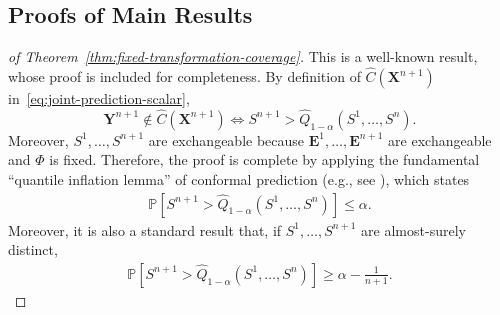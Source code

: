 \subsection{Proofs of Main Results}
\label{app:proofs-thms}

\begin{proof}[of Theorem~\ref{thm:fixed-transformation-coverage}]
This is a well-known result, whose proof is included for completeness. 
By definition of $\hat{C}(\mathbf{X}^{n+1})$ in~\eqref{eq:joint-prediction-scalar},
\[
 \mathbf{Y}^{n+1} \notin \hat{C}(\mathbf{X}^{n+1}) \Longleftrightarrow S^{n+1} > \hat{Q}_{1-\alpha}(S^1,\ldots,S^n).
\]
Moreover, $S^1,\ldots,S^{n+1}$ are exchangeable because $\mathbf{E}^1,\ldots,\mathbf{E}^{n+1}$ are exchangeable and $\Phi$ is fixed.
Therefore, the proof is complete by applying the fundamental ``quantile inflation lemma'' of conformal prediction (e.g., see \citet{angelopoulos2025theoreticalfoundationsconformalprediction}), which states 
\begin{align*}
  \mathbb{P}\left[ S^{n+1} > \hat{Q}_{1-\alpha}(S^1,\ldots,S^n) \right] \leq \alpha.
\end{align*}
Moreover, it is also a standard result that, if $S^1,\ldots,S^{n+1}$ are almost-surely distinct,
\begin{align*}
  \mathbb{P}\left[ S^{n+1} > \hat{Q}_{1-\alpha}(S^1,\ldots,S^n) \right] \geq \alpha - \frac{1}{n+1}.
\end{align*}
\end{proof}

